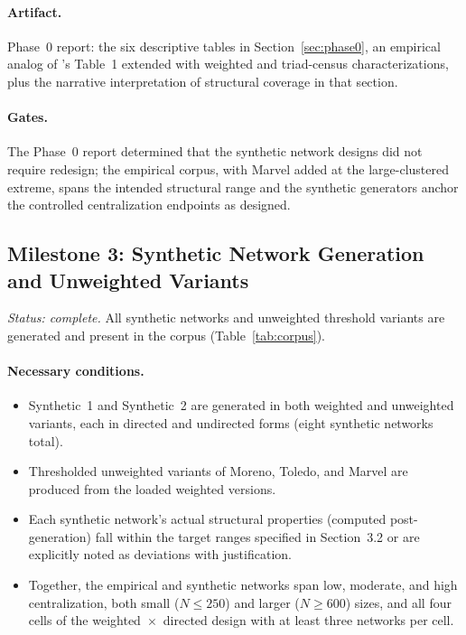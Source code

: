 \documentclass[11pt]{article}
\begin{document}
\paragraph{Artifact.} Phase~0 report: the six descriptive tables in Section~\ref{sec:phase0}, an empirical analog of \citet{SmithMorganMoody2022}'s Table~1 extended with weighted and triad-census characterizations, plus the narrative interpretation of structural coverage in that section.

\paragraph{Gates.} The Phase~0 report determined that the synthetic network designs did not require redesign; the empirical corpus, with Marvel added at the large-clustered extreme, spans the intended structural range and the synthetic generators anchor the controlled centralization endpoints as designed.

\subsection*{Milestone 3: Synthetic Network Generation and Unweighted Variants}

\emph{Status: complete.} All synthetic networks and unweighted threshold variants are generated and present in the corpus (Table~\ref{tab:corpus}).

\paragraph{Necessary conditions.}
\begin{itemize}[leftmargin=*, itemsep=2pt]
  \item Synthetic~1 and Synthetic~2 are generated in both weighted and unweighted variants, each in directed and undirected forms (eight synthetic networks total).
  \item Thresholded unweighted variants of Moreno, Toledo, and Marvel are produced from the loaded weighted versions.
  \item Each synthetic network's actual structural properties (computed post-generation) fall within the target ranges specified in Section~3.2 or are explicitly noted as deviations with justification.
  \item Together, the empirical and synthetic networks span low, moderate, and high centralization, both small ($N \leq 250$) and larger ($N \geq 600$) sizes, and all four cells of the weighted~$\times$~directed design with at least three networks per cell.
\end{itemize}
\end{document}
